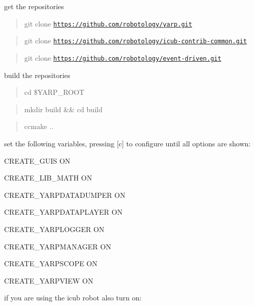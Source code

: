 get the repositories

\begin{quote}
git clone \href{https://github.com/robotology/yarp.git}{\tt https\+://github.\+com/robotology/yarp.\+git} \end{quote}


\begin{quote}
git clone \href{https://github.com/robotology/icub-contrib-common.git}{\tt https\+://github.\+com/robotology/icub-\/contrib-\/common.\+git} \end{quote}


\begin{quote}
git clone \href{https://github.com/robotology/event-driven.git}{\tt https\+://github.\+com/robotology/event-\/driven.\+git} \end{quote}


build the repositories

\begin{quote}
cd \$\+Y\+A\+R\+P\+\_\+\+R\+O\+OT \end{quote}


\begin{quote}
mkdir build \&\& cd build \end{quote}


\begin{quote}
ccmake .. \end{quote}


set the following variables, pressing \mbox{[}c\mbox{]} to configure until all options are shown\+:


\begin{DoxyItemize}
\item C\+R\+E\+A\+T\+E\+\_\+\+G\+U\+IS ON
\item C\+R\+E\+A\+T\+E\+\_\+\+L\+I\+B\+\_\+\+M\+A\+TH ON
\item C\+R\+E\+A\+T\+E\+\_\+\+Y\+A\+R\+P\+D\+A\+T\+A\+D\+U\+M\+P\+ER ON
\item C\+R\+E\+A\+T\+E\+\_\+\+Y\+A\+R\+P\+D\+A\+T\+A\+P\+L\+A\+Y\+ER ON
\item C\+R\+E\+A\+T\+E\+\_\+\+Y\+A\+R\+P\+L\+O\+G\+G\+ER ON
\item C\+R\+E\+A\+T\+E\+\_\+\+Y\+A\+R\+P\+M\+A\+N\+A\+G\+ER ON
\item C\+R\+E\+A\+T\+E\+\_\+\+Y\+A\+R\+P\+S\+C\+O\+PE ON
\item C\+R\+E\+A\+T\+E\+\_\+\+Y\+A\+R\+P\+V\+I\+EW ON
\end{DoxyItemize}

if you are using the icub robot also turn on\+:


